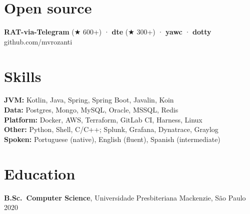 \documentclass[10pt,a4paper]{article}
\begin{document}
\section{Open source}
\small
\textbf{RAT-via-Telegram} (★ 600+) · \textbf{dte} (★ 300+) · \textbf{yawc} · \textbf{dotty} \hfill github.com/mvrozanti

\section{Skills}
\small
\textbf{JVM:} Kotlin, Java, Spring, Spring Boot, Javalin, Koin\\
\textbf{Data:} Postgres, Mongo, MySQL, Oracle, MSSQL, Redis\\
\textbf{Platform:} Docker, AWS, Terraform, GitLab CI, Harness, Linux\\
\textbf{Other:} Python, Shell, C/C++; Splunk, Grafana, Dynatrace, Graylog\\
\textbf{Spoken:} Portuguese (native), English (fluent), Spanish (intermediate)

\section{Education}
\small\textbf{B.Sc.\ Computer Science}, Universidade Presbiteriana Mackenzie, São Paulo \hfill 2020
\end{document}
